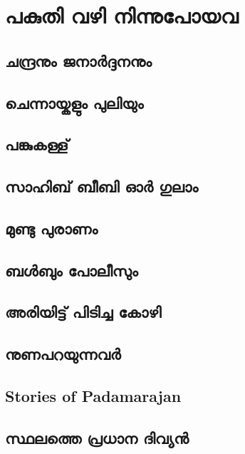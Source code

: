 \documentclass[10pt,a4paper]{report}
\begin{document}
\chapter{പകുതി വഴി നിന്നുപോയവ }

\section{ ചന്ദ്രനും ജനാർദ്ദനനും }

\section{ ചെന്നായ്കളും പുലിയും } 

\section{പങ്കുകള്ള് }

\section{സാഹിബ് ബീബി ഓർ ഗുലാം} 

\section{ മുണ്ടു പുരാണം }

\section{ബൾബും പോലീസും }

\section{അരിയിട്ട് പിടിച്ച കോഴി }
\section{നുണപറയുന്നവർ }
\section{Stories of Padamarajan}
\section{സ്ഥലത്തെ പ്രധാന ദിവ്യൻ }
\end{document}
